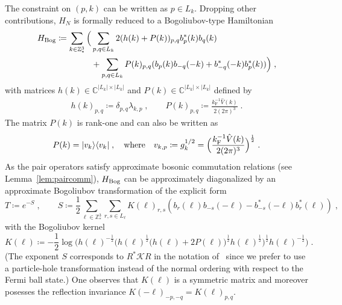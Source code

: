 \documentclass[12pt,a4paper]{article}
\numberwithin{equation}{section}
\newcommand{\cK}{\mathcal{K}}
\newcommand{\CCC}{\mathbb{C}}
\newcommand{\ZZZ}{\mathbb{Z}}
\newcommand{\1}{\mathbb{I}}
\newcommand{\Bog}{\textnormal{Bog}}
\newcommand{\F}{\mathrm{F}}
\newcommand{\half}{\frac{1}{2}}
\theoremstyle{plain}
\theoremstyle{definition}
\theoremstyle{remark}
\theoremstyle{plain}
\theoremstyle{definition}
\theoremstyle{remark}
\begin{document}
The constraint on $ (p,k) $ can be written as $ p \in L_k $.
Dropping other contributions, $ H_N $ is formally reduced to a Bogoliubov-type Hamiltonian~\cite[(1.34)]{CHN23}
\begin{equation} \label{eq:HBog}
\begin{split}
	H_{\Bog}
	\coloneq \sum_{k \in \ZZZ^3_*} \Big( & \sum_{p,q \in L_k} 2 (h(k) + P(k))_{p,q} b^*_p(k) b_q(k) \\
	& 		+ \sum_{p,q \in L_k} P(k)_{p,q} (b_p(k) b_{-q}(-k) + b^*_{-q}(-k) b^*_p(k)) \Big) \;,
\end{split}
\end{equation}
with matrices $ h(k) \in \CCC^{|L_k| \times |L_k|}$ and $P(k) \in \CCC^{|L_k| \times |L_k|} $ defined by
\begin{equation} \label{eq:HkPk}
\begin{aligned}
	h(k)_{p,q} \coloneq \delta_{p,q} \lambda_{k,p} \;, \qquad
	P(k)_{p,q} \coloneq \frac{k_{\F}^{-1}\hat{V}(k) }{2 (2 \pi)^3} \;.
\end{aligned}
\end{equation}
The matrix $ P(k) $ is rank-one and can also be written as
\begin{equation}P(k) = \lvert v_k \rangle \langle v_k \rvert \;, \quad \textnormal{where} \quad v_{k,p} \coloneq g_k^{1/2} = \Big( \frac{k_{\F}^{-1} \hat{V}(k) }{2 (2 \pi)^3} \Big)^\half \;.
\end{equation}
 As the pair operators satisfy approximate bosonic commutation relations (see Lemma~\ref{lem:paircomm}), $ H_{\Bog} $ can be approximately diagonalized by an approximate Bogoliubov transformation \cite[Thm.~1.4]{CHN23} of the explicit form
\begin{equation} \label{eq:T}
	T \coloneq e^{-S} \;, \qquad
	S \coloneq \frac{1}{2}\sum_{\ell\in \mathbb{Z}^3_*}\sum_{r,s\in L_\ell}K(\ell)_{r,s}\left(b_r(\ell)b_{-s}(-\ell)-b^*_{-s}(-\ell)b^*_{r}(\ell)\right) \;,
\end{equation}
with the Bogoliubov kernel
\begin{equation} \label{eq:K}
	K(\ell) \coloneq - \half \log \Big( h(\ell)^{-\half}
		\big( h(\ell)^{\half} \big( h(\ell) + 2 P(\ell) \big)^{\half} h(\ell)^{\half}\big)^{\half}
		h(\ell)^{-\half} \Big) \;.
\end{equation}
(The exponent $ S $ corresponds to $ R^* \cK R $ in the notation of~\cite{CHN23} since we prefer to use a particle-hole transformation instead of the normal ordering with respect to the Fermi ball state.)
One observes that $K(\ell)$ is a symmetric matrix and moreover posesses the reflection invariance $ K(-\ell)_{-p,-q} = K(\ell)_{p,q} $.
\end{document}
